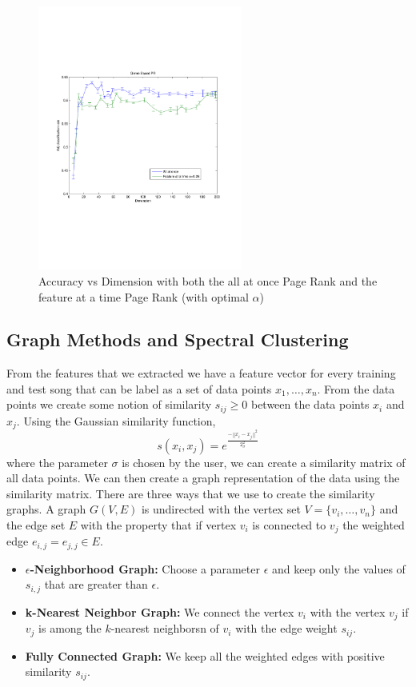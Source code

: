 \documentclass[12pt]{article}
\begin{document}
\begin{figure}[!h]
\begin{center}
\vspace{-1in}
\includegraphics[width=0.6\textwidth]{figures/adjPR.pdf}
\vspace{-1in}
\caption{Accuracy vs Dimension with both the all at once Page Rank and the feature at a time Page Rank (with optimal $\alpha$)}
\end{center}
\end{figure}

\subsection{Graph Methods and Spectral Clustering}
From the features that we extracted we have a feature vector for every training and test song that can be label as a set of data points $x_1,\hdots, x_n$. From the data points we create some notion of similarity $s_{ij} \geq 0$  between the data points $x_i$ and $x_j$. Using the Gaussian similarity function, 
\[s(x_i,x_j) = e^{\frac{-||x_i-x_j||^2}{2_\sigma^2}}\]
where the parameter $\sigma$ is chosen by the user, we can create a similarity matrix of all data points. We can then create a graph representation of the data using the similarity matrix. There are three ways that we use to create the similarity graphs. A graph $G(V,E)$ is undirected with the vertex set $V = \{ v_i, \hdots, v_n\}$ and the edge set $E$  with the property that if vertex $v_i$ is connected to $v_j$ the weighted edge $e_{i,j} = e_{j,j} \in E$.  

\begin{itemize}
\item {\bf{$\epsilon$-Neighborhood Graph:}} Choose a parameter $\epsilon$ and keep only the values of $s_{i,j}$ that are greater than $\epsilon$.  
\item {\bf{k-Nearest Neighbor Graph:}} We connect the vertex $v_i$ with the vertex $v_j$ if $v_j$ is among the $k$-nearest neighborsn of $v_i$ with the edge weight $s_{ij}$. 
\item{\bf{Fully Connected Graph:}} We keep all the weighted edges with positive similarity $s_{ij}$. 
\end{itemize}
\end{document}
